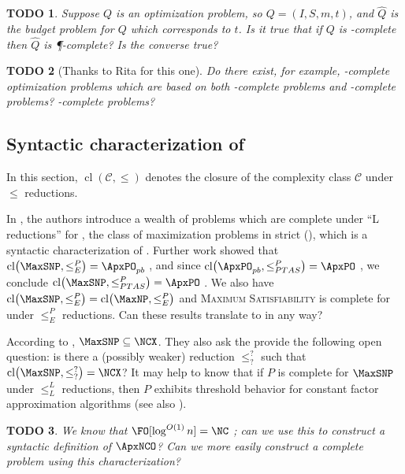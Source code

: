 \documentclass[]{article}
\theoremstyle{plain}
\newtheorem{todo}{TODO}
\theoremstyle{definition}
\newcommand{\cl}{\operatorname{cl}}
\let\originalleft\left
\let\originalright\right
\renewcommand{\left}{\mathopen{}\mathclose\bgroup\originalleft}
\renewcommand{\right}{\aftergroup\egroup\originalright}
\begin{document}
\begin{todo}
  Suppose $Q$ is an optimization problem, so $Q=(I, S, m, t)$, and $\hat{Q}$ is the budget problem for $Q$ which corresponds to $t$.
  Is it true that if $Q$ is \PO-complete then $\hat{Q}$ is \P-complete?
  Is the converse true?
\end{todo}

\begin{todo}[Thanks to Rita for this one]
  Do there exist, for example, \ApxPO-complete optimization problems which are based on both \NP-complete problems and \PSPACE-complete problems?
  \STP-complete problems?
\end{todo}

\subsection{Syntactic characterization of \texorpdfstring{\ApxNCO}{ApxNCO}}

In this section, $\cl(\mathcal{C}, \leq)$ denotes the closure of the complexity class $\mathcal{C}$ under $\leq$ reductions.

In \cite{py91}, the authors introduce a wealth of problems which are complete under ``L reductions'' for \MaxSNP, the class of maximization problems in strict \NP{} (\SNP), which is a syntactic characterization of \NP.
Further work showed that $\cl\left(\MaxSNP, \leq^P_E\right) = \ApxPO_{pb}$ \cite[Theorem~1]{kmsv99}, and since $\cl\left(\ApxPO_{pb}, \leq^P_{PTAS}\right) = \ApxPO$ \cite{ct00}, we conclude $\cl\left(\MaxSNP, \leq^P_{PTAS}\right) = \ApxPO$ \cite{kmsv99}.
We also have $\cl\left(\MaxSNP, \leq^P_E\right) = \cl\left(\MaxNP, \leq^P_E\right)$ \cite[Theorem~2]{kmsv99} and \textsc{Maximum Satisfiability} is complete for \MaxNP{} under $\leq^P_E$ reductions.
Can these results translate to \NC{} in any way?

According to \cite[Theorem~9.1.3]{dsst97}, $\MaxSNP \subseteq \NCX$.
They also ask the provide the following open question: is there a (possibly weaker) reduction $\leq^?_?$ such that $\cl\left(\MaxSNP, \leq^?_?\right) = \NCX$?
It may help to know that if $P$ is complete for $\MaxSNP$ under $\leq^L_L$ reductions, then $P$ exhibits threshold behavior for constant factor \NC{} approximation algorithms \cite[Theorem~9]{sx95} (see also \cite[Theorem~9.2.3]{dsst97}).

\begin{todo}
  We know that $\FO[\log^{O(1)} n] = \NC$ \cite[Theorem~5.2]{immerman99}; can we use this to construct a syntactic definition of $\ApxNCO$?
  Can we more easily construct a complete problem using this characterization?
\end{todo}
\end{document}
